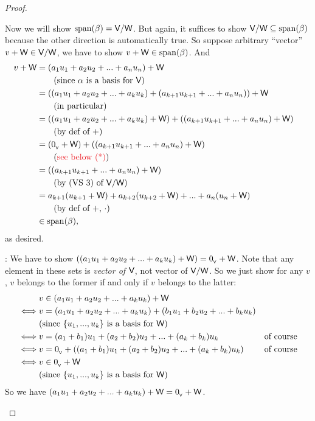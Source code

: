 \begin{proof}
\begin{enumerate}
Now we will show \(\operatorname{span}(\beta) = \textsf{V}/\textsf{W}\).
But again, it suffices to show \(\textsf{V}/\textsf{W} \subseteq \operatorname{span}(\beta)\) because the other direction is automatically true.
So suppose arbitrary ``vector'' \(v + \textsf{W} \in \textsf{V}/\textsf{W}\), we have to show \(v + \textsf{W} \in \operatorname{span}(\beta)\).
And
\begin{align*}
    v + \W & = (a_1 u_1 + a_2 u_2 + ... + a_n u_n) + \W \\
          & \text{\ \ \ \ \ \ (since \(\alpha\) is a basis for \(\V\))} \\
          & = ((a_1 u_1 + a_2 u_2 + ... + a_k u_k) + (a_{k + 1} u_{k + 1} + ... + a_n u_n)) + \W \\
          & \text{\ \ \ \ \ \ (in particular)} \\
          & = ((a_1 u_1 + a_2 u_2 + ... + a_k u_k) + \W) + ((a_{k + 1} u_{k + 1} + ... + a_n u_n) + \W) \\
          & \text{\ \ \ \ \ \  (by def of \(+\))} \\
          & = (\OV + \W) + ((a_{k + 1} u_{k + 1} + ... + a_n u_n) + \W) \\
          & \text{\ \ \ \ \ \ (\RED{see below (*)})} \\
          & = ((a_{k + 1} u_{k + 1} + ... + a_n u_n) + \W) & \\
          & \text{\ \ \ \ \ \ (by (VS 3) of \(\V/\W\))} \\
          & = a_{k + 1}(u_{k + 1} + \W) + a_{k + 2}(u_{k + 2} + \W) + ... + a_n(u_n + \W) \\
          & \text{\ \ \ \ \ \ (by def of \(+\), \(\cdot\))} \\
          & \in \spann(\beta),
\end{align*}
as desired.

\RED{(*)}: We have to show \(((a_1 u_1 + a_2 u_2 + ... + a_k u_k) + \textsf{W}) = 0_{_{\textsf{V}}} + \textsf{W}\).
Note that any element in these sets is \emph{vector of \(\textsf{V}\)}, not vector of \(\textsf{V}/\textsf{W}\).
So we just show for any \(v\), \(v\) belongs to the former if and only if \(v\) belongs to the latter:
\begin{align*}
         & v \in (a_1 u_1 + a_2 u_2 + ... + a_k u_k) + \textsf{W} \\
    \iff & v = (a_1 u_1 + a_2 u_2 + ... + a_k u_k) + (b_1 u_1 + b_2 u_2 + ... + b_k u_k) \\
         & \text{(since \(\{ u_1, ..., u_k \}\) is a basis for \(\textsf{W}\))} \\
    \iff & v = (a_1 + b_1) u_1 + (a_2 + b_2) u_2 + ... + (a_k + b_k) u_k & \text{of course} \\
    \iff & v = 0_{_{\textsf{V}}} + ((a_1 + b_1) u_1 + (a_2 + b_2) u_2 + ... + (a_k + b_k) u_k) & \text{of course} \\
    \iff & v \in 0_{_{\textsf{V}}} + \textsf{W} \\
         & \text{(since \(\{ u_1, ..., u_k \}\) is a basis for \(\textsf{W}\))} \\
\end{align*}
So we have \((a_1 u_1 + a_2 u_2 + ... + a_k u_k) + \textsf{W} = 0_{_{\textsf{V}}} + \textsf{W}\).


\end{enumerate}
\end{proof}
